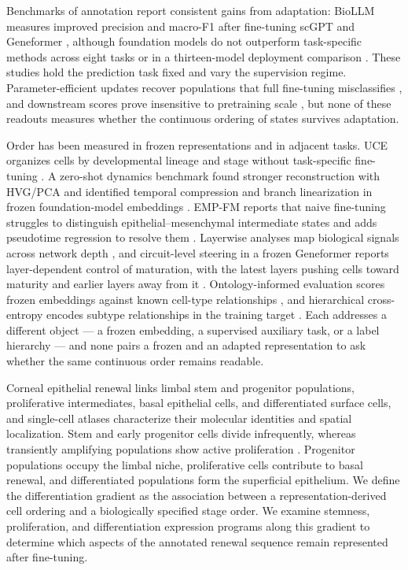 \documentclass[12pt,letterpaper]{article}
\begin{document}
Benchmarks of annotation report consistent gains from adaptation: BioLLM measures improved precision and macro-F1 after fine-tuning scGPT and Geneformer \cite{qiu2025biollm}, although foundation models do not outperform task-specific methods across eight tasks \cite{liu2026} or in a thirteen-model deployment comparison \cite{hou2026}. These studies hold the prediction task fixed and vary the supervision regime. Parameter-efficient updates recover populations that full fine-tuning misclassifies \cite{he2026scpeft}, and downstream scores prove insensitive to pretraining scale \cite{finetuningmasking2026}, but none of these readouts measures whether the continuous ordering of states survives adaptation.

Order has been measured in frozen representations and in adjacent tasks. UCE organizes cells by developmental lineage and stage without task-specific fine-tuning \cite{rosen2026uce}. A zero-shot dynamics benchmark found stronger reconstruction with HVG/PCA and identified temporal compression and branch linearization in frozen foundation-model embeddings \cite{zhou2026}. EMP-FM reports that naive fine-tuning struggles to distinguish epithelial--mesenchymal intermediate states and adds pseudotime regression to resolve them \cite{pan2024}. Layerwise analyses map biological signals across network depth \cite{kendiukhov2026genomics,kendiukhov2026bioinformatics}, and circuit-level steering in a frozen Geneformer reports layer-dependent control of maturation, with the latest layers pushing cells toward maturity and earlier layers away from it \cite{kendiukhov2026circuits}. Ontology-informed evaluation scores frozen embeddings against known cell-type relationships \cite{wu2025}, and hierarchical cross-entropy encodes subtype relationships in the training target \cite{hce2026}. Each addresses a different object --- a frozen embedding, a supervised auxiliary task, or a label hierarchy --- and none pairs a frozen and an adapted representation to ask whether the same continuous order remains readable.

Corneal epithelial renewal links limbal stem and progenitor populations, proliferative intermediates, basal epithelial cells, and differentiated surface cells, and single-cell atlases characterize their molecular identities and spatial localization. Stem and early progenitor cells divide infrequently, whereas transiently amplifying populations show active proliferation \cite{collin2021,ligocki2021,li2021oculsurf}. Progenitor populations occupy the limbal niche, proliferative cells contribute to basal renewal, and differentiated populations form the superficial epithelium. We define the differentiation gradient as the association between a representation-derived cell ordering and a biologically specified stage order. We examine stemness, proliferation, and differentiation expression programs along this gradient to determine which aspects of the annotated renewal sequence remain represented after fine-tuning.
\end{document}
